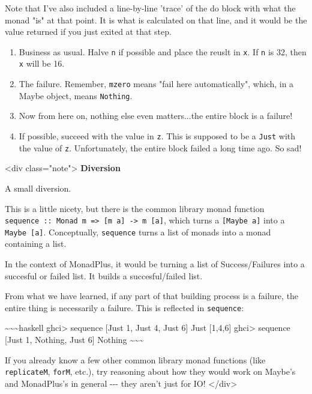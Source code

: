 \documentclass[]{article}
\begin{document}
Note that I've also included a line-by-line 'trace' of the do block with what
the monad "is" at that point. It is what is calculated on that line, and it
would be the value returned if you just exited at that step.

\begin{enumerate}
\tightlist
\item
  Business as usual. Halve \texttt{n} if possible and place the reuslt in
  \texttt{x}. If \texttt{n} is 32, then \texttt{x} will be 16.
\item
  The failure. Remember, \texttt{mzero} means "fail here automatically", which,
  in a Maybe object, means \texttt{Nothing}.
\item
  Now from here on, nothing else even matters...the entire block is a failure!
\item
  If possible, succeed with the value in \texttt{z}. This is supposed to be a
  \texttt{Just} with the value of \texttt{z}. Unfortunately, the entire block
  failed a long time ago. So sad!
\end{enumerate}

\textless{}div class="note"\textgreater{} \textbf{Diversion}

A small diversion.

This is a little nicety, but there is the common library monad function
\texttt{sequence\ ::\ Monad\ m\ =\textgreater{}\ {[}m\ a{]}\ -\textgreater{}\ m\ {[}a{]}},
which turns a \texttt{{[}Maybe\ a{]}} into a \texttt{Maybe\ {[}a{]}}.
Conceptually, \texttt{sequence} turns a list of monads into a monad containing a
list.

In the context of MonadPlus, it would be turning a list of Success/Failures into
a succesful or failed list. It builds a succesful/failed list.

From what we have learned, if any part of that building process is a failure,
the entire thing is necessarily a failure. This is reflected in
\texttt{sequence}:

\textasciitilde{}\textasciitilde{}\textasciitilde{}haskell ghci\textgreater{}
sequence {[}Just 1, Just 4, Just 6{]} Just {[}1,4,6{]} ghci\textgreater{}
sequence {[}Just 1, Nothing, Just 6{]} Nothing
\textasciitilde{}\textasciitilde{}\textasciitilde{}

If you already know a few other common library monad functions (like
\texttt{replicateM}, \texttt{forM}, etc.), try reasoning about how they would
work on Maybe's and MonadPlus's in general -\/-\/- they aren't just for IO!
\textless{}/div\textgreater{}
\end{document}
